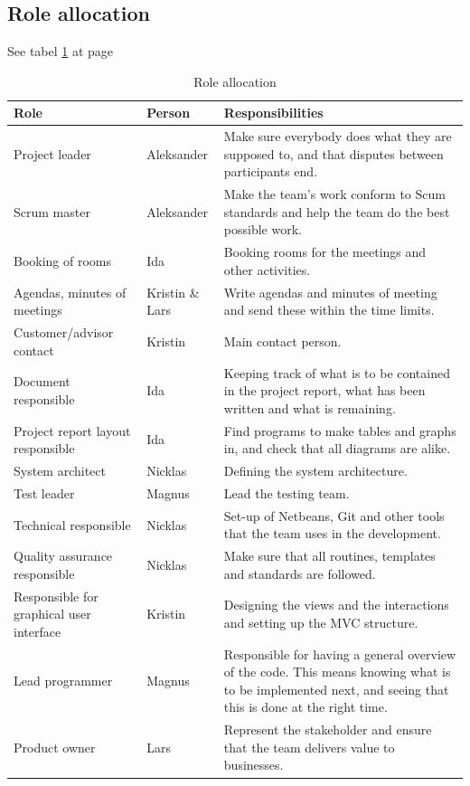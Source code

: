 \subsection{Role allocation}
See tabel \ref{tab:roleallocation} at page \pageref{tab:roleallocation}
\begin{table}
\begin{tabularx}{\linewidth}{>{\setlength\hsize{.5\hsize}}X|>{\setlength\hsize{0.3\hsize}}X|>{\setlength\hsize{1\hsize}}X}
\textbf{Role} & \textbf{Person} & \textbf{Responsibilities} \\ \hline \hline
Project leader & Aleksander & Make sure everybody does what they are supposed to, and that disputes between participants end. \\ \hline
Scrum master & Aleksander & Make the team’s work conform to Scum standards and help the team do the best possible work. \\ \hline
Booking of rooms & Ida & Booking rooms for the meetings and other activities. \\ \hline
Agendas, minutes of meetings & Kristin \& Lars &Write agendas and minutes of meeting and send these within the time limits. \\ \hline
Customer/advisor contact & Kristin & Main contact person. \\ \hline
Document responsible & Ida &Keeping track of what is to be contained in the project report, what has been written and what is remaining. \\ \hline
Project report layout responsible & Ida &Find programs to make tables and graphs in, and check that all diagrams are alike. \\ \hline
System architect & Nicklas & Defining the system architecture. \\ \hline
Test leader & Magnus & Lead the testing team. \\ \hline
Technical responsible & Nicklas & Set-up of Netbeans, Git and other tools that the team uses in the development. \\ \hline
Quality assurance responsible & Nicklas & Make sure that all routines, templates and standards are followed. \\ \hline
Responsible for graphical user interface & Kristin & Designing the views and the interactions and setting up the MVC structure. \\ \hline
Lead programmer & Magnus & Responsible for having a general overview of the code. This means knowing what is to be implemented next, and seeing that this is done at the right time. \\ \hline
Product owner & Lars & Represent the stakeholder and ensure that the team delivers value to businesses.
\end{tabularx}
\caption {Role allocation} \label{tab:roleallocation}
\end{table}

